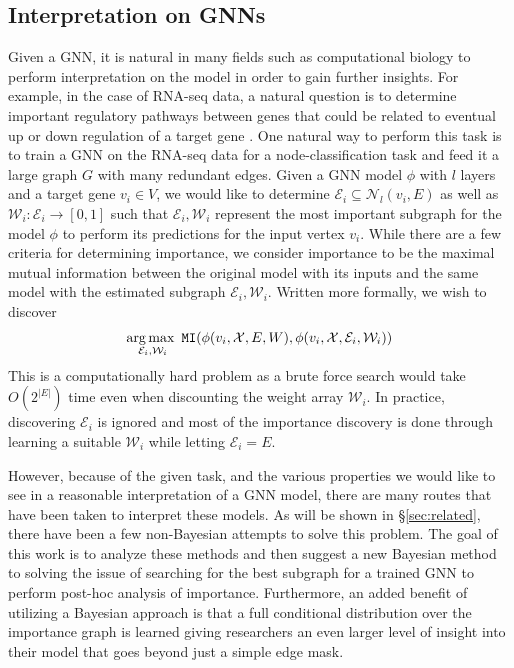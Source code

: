 \subsection{Interpretation on GNNs}
\label{sec:intro-interp}
Given a GNN, it is natural in many fields such as computational biology to perform interpretation on the model in order to gain further insights. For example, in the case of RNA-seq data, a natural question is to determine important regulatory pathways between genes that could be related to eventual up or down regulation of a target gene \cite{petralia_new_2016}. One natural way to perform this task is to train a GNN on the RNA-seq data for a node-classification task and feed it a large graph $G$ with many redundant edges. Given a GNN model $\phi$ with $l$ layers and a target gene $v_{i} \in V$, we would like to determine $\mathcal{E}_{i} \subseteq \mathcal{N}_{l}(v_{i}, E)$ as well as $\mathcal{W}_{i} : \mathcal{E}_{i} \rightarrow [0,1]$ such that $\mathcal{E}_{i}, \mathcal{W}_{i}$ represent the most important subgraph for the model $\phi$ to perform its predictions for the input vertex $v_{i}$. While there are a few criteria for determining importance, we consider importance to be the maximal mutual information between the original model with its inputs and the same model with the estimated subgraph $\mathcal{E}_{i}, \mathcal{W}_{i}$. Written more formally, we wish to discover
\begin{align*}
  \operatorname*{arg\,max\,\,}_{\mathcal{E}_{i}, \mathcal{W}_{i}} \mathtt{MI}(\phi(v_{i}, \mathcal{X}, E, W), \phi(v_{i}, \mathcal{X}, \mathcal{E}_{i}, \mathcal{W}_{i}))
\end{align*}
This is a computationally hard problem as a brute force search would take $O(2^{|E|})$ time even when discounting the weight array $\mathcal{W}_{i}$. In practice, discovering $\mathcal{E}_i$ is ignored and most of the importance discovery is done through learning a suitable $\mathcal{W}_i$ while letting $\mathcal{E}_i = E$.

However, because of the given task, and the various properties we would like to see in a reasonable interpretation of a GNN model, there are many routes that have been taken to interpret these models. As will be shown in \S\ref{sec:related}, there have been a few non-Bayesian attempts to solve this problem. The goal of this work is to analyze these methods and then suggest a new Bayesian method to solving the issue of searching for the best subgraph for a trained GNN to perform post-hoc analysis of importance. Furthermore, an added benefit of utilizing a Bayesian approach is that a full conditional distribution over the importance graph is learned giving researchers an even larger level of insight into their model that goes beyond just a simple edge mask.

